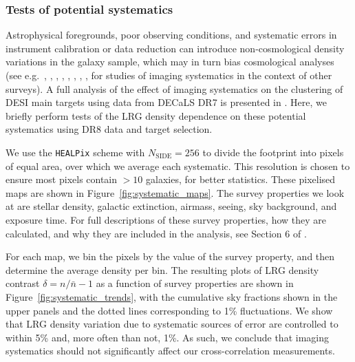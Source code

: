 \subsubsection{Tests of potential systematics}

Astrophysical foregrounds, poor observing conditions, and systematic errors in instrument calibration or data reduction can introduce non-cosmological density variations in the galaxy sample, which may in turn bias cosmological analyses (see e.g.\ \citealt{Myers06}, \citealt{Crocce11}, \citealt{Ross11}, \citealt{Suchyta++16}, \citealt{Crocce++16}, \citealt{Leistedt++16}, \citealt{ElvinPoole18}, \citealt{Ross20}, \citealt{Weaverdyck20} for studies of imaging systematics in the context of other surveys). A full analysis of the effect of imaging systematics  on the clustering of DESI main targets using data from DECaLS DR7 is presented in \citealt{Kitanidis++19}. Here, we briefly perform tests of the LRG density dependence on these potential systematics using DR8 data and target selection.  

We use the \texttt{HEALPix} scheme with $N_{\text{SIDE}} = 256$ to divide the footprint into pixels of equal area, over which we average each systematic. This resolution is chosen to ensure most pixels contain $>10$ galaxies, for better statistics. These pixelised maps are shown in Figure~\ref{fig:systematic_maps}. The survey properties we look at are stellar density, galactic extinction, airmass, seeing, sky background, and exposure time. For full descriptions of these survey properties, how they are calculated, and why they are included in the analysis, see Section 6 of \citealt{Kitanidis++19}. 

For each map, we bin the pixels by the value of the survey property, and then determine the average density per bin. The resulting plots of LRG density contrast $\delta = n/\bar{n} - 1$ as a function of survey properties are shown in Figure~\ref{fig:systematic_trends}, with the cumulative sky fractions shown in the upper panels and the dotted lines corresponding to 1\% fluctuations. We show that LRG density variation due to systematic sources of error are controlled to within 5\% and, more often than not, 1\%. As such, we conclude that imaging systematics should not significantly affect our cross-correlation measurements.


